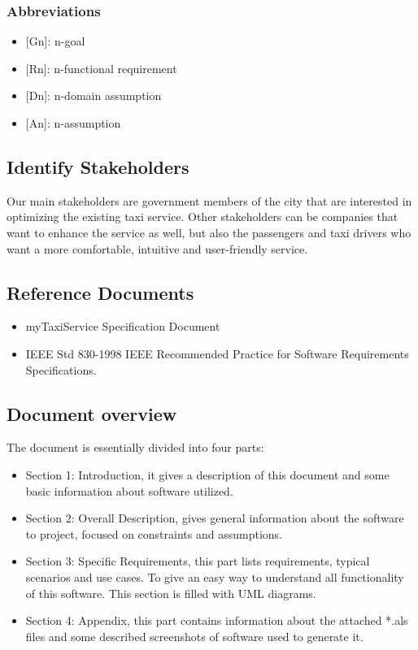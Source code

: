 \documentclass[a4paper,12pt,dvipsnames]{article}%
\begin{document}
\subsubsection{Abbreviations}
\begin{itemize}
\item {[}Gn{]}: n-goal %
\item {[}Rn{]}: n-functional requirement
\item {[}Dn{]}: n-domain assumption
\item {[}An{]}: n-assumption
\end{itemize}
\subsection{Identify Stakeholders}
Our main stakeholders are government members of the city that are interested in optimizing the existing taxi service.
Other stakeholders can be companies that want to enhance the service as well, but also the passengers and taxi drivers who want a more comfortable, intuitive and user-friendly service.
\subsection{Reference Documents}
\begin{itemize}
\item myTaxiService Specification Document
\item IEEE Std 830-1998 IEEE Recommended Practice for Software 
Requirements Specifications.
\end{itemize}
\subsection{Document overview}
The document is essentially divided into four parts:
\begin{itemize}
\item Section 1: Introduction, it gives a description of this document and some basic information about software utilized.
\item Section 2: Overall Description, gives general information about the software to project, focused on constraints and assumptions.
\item Section 3: Specific Requirements, this part lists requirements, typical scenarios and use cases. To give an easy way to understand all functionality
of this software. This section is filled with UML diagrams.
\item Section 4: Appendix, this part contains information about the attached *.als files and some described screenshots of software used to generate it.
\end{itemize}
\newpage
\end{document}
